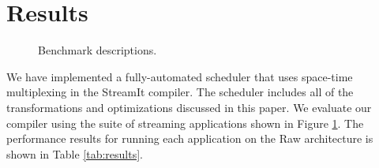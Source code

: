 \section{Results}
\label{sec:results}

\begin{figure}
\centering
{}
\caption{Benchmark descriptions.\protect\label{fig:benchmarks}}
\end{figure}

We have implemented a fully-automated scheduler that uses space-time
multiplexing in the StreamIt compiler.  The scheduler includes all of
the transformations and optimizations discussed in this paper.  We
evaluate our compiler using the suite of streaming applications shown
in Figure \ref{fig:benchmarks}.  The performance results for running
each application on the Raw architecture is shown in Table
\ref{tab:results}.
